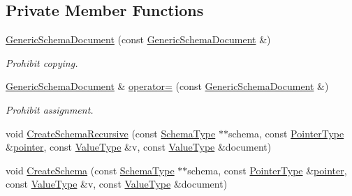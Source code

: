 \subsection*{Private Member Functions}
\begin{DoxyCompactItemize}
\item 
\mbox{\hyperlink{classrapidjson_1_1_generic_schema_document_a4792ceb26c9b362f8035f9b719086eec}{Generic\+Schema\+Document}} (const \mbox{\hyperlink{classrapidjson_1_1_generic_schema_document}{Generic\+Schema\+Document}} \&)
\begin{DoxyCompactList}\small\item\em Prohibit copying. \end{DoxyCompactList}\item 
\mbox{\hyperlink{classrapidjson_1_1_generic_schema_document}{Generic\+Schema\+Document}} \& \mbox{\hyperlink{classrapidjson_1_1_generic_schema_document_a865332b0146d97f23d037866ba264bed}{operator=}} (const \mbox{\hyperlink{classrapidjson_1_1_generic_schema_document}{Generic\+Schema\+Document}} \&)
\begin{DoxyCompactList}\small\item\em Prohibit assignment. \end{DoxyCompactList}\item 
void \mbox{\hyperlink{classrapidjson_1_1_generic_schema_document_a0888d84375cd5bfb6ee55fe8997d4c5f}{Create\+Schema\+Recursive}} (const \mbox{\hyperlink{classrapidjson_1_1_generic_schema_document_aaf4e7f371de938025f7ed4be3b83266e}{Schema\+Type}} $\ast$$\ast$schema, const \mbox{\hyperlink{classrapidjson_1_1_generic_schema_document_a61540c0f8aa542760ae03257a0e6dab7}{Pointer\+Type}} \&\mbox{\hyperlink{namespacerapidjson_aa5b8c07c8721afe6870a0210820ea19d}{pointer}}, const \mbox{\hyperlink{classrapidjson_1_1_generic_schema_document_a87eb1db271e7f57442802a5f4f6178f3}{Value\+Type}} \&v, const \mbox{\hyperlink{classrapidjson_1_1_generic_schema_document_a87eb1db271e7f57442802a5f4f6178f3}{Value\+Type}} \&document)
\item 
void \mbox{\hyperlink{classrapidjson_1_1_generic_schema_document_ab43d0cbe1c1c2512e9a38751ef7c7776}{Create\+Schema}} (const \mbox{\hyperlink{classrapidjson_1_1_generic_schema_document_aaf4e7f371de938025f7ed4be3b83266e}{Schema\+Type}} $\ast$$\ast$schema, const \mbox{\hyperlink{classrapidjson_1_1_generic_schema_document_a61540c0f8aa542760ae03257a0e6dab7}{Pointer\+Type}} \&\mbox{\hyperlink{namespacerapidjson_aa5b8c07c8721afe6870a0210820ea19d}{pointer}}, const \mbox{\hyperlink{classrapidjson_1_1_generic_schema_document_a87eb1db271e7f57442802a5f4f6178f3}{Value\+Type}} \&v, const \mbox{\hyperlink{classrapidjson_1_1_generic_schema_document_a87eb1db271e7f57442802a5f4f6178f3}{Value\+Type}} \&document)

\end{DoxyCompactItemize}
